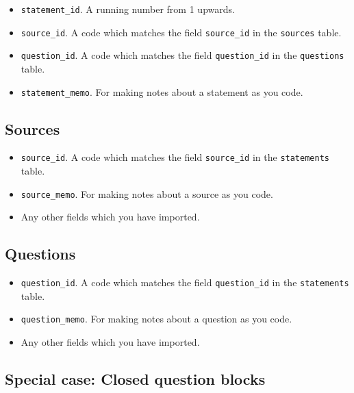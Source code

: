 \documentclass[
]{book}
\providecommand{\tightlist}{%
  \setlength{\itemsep}{0pt}\setlength{\parskip}{0pt}}
\begin{document}
\begin{itemize}
\tightlist
\item
  \texttt{statement\_id}. A running number from 1 upwards.
\item
  \texttt{source\_id}. A code which matches the field \texttt{source\_id} in the \texttt{sources} table.
\item
  \texttt{question\_id}. A code which matches the field \texttt{question\_id} in the \texttt{questions} table.
\item
  \texttt{statement\_memo}. For making notes about a statement as you code.
\end{itemize}

\hypertarget{sources}{%
\subsection{Sources}\label{sources}}

\begin{itemize}
\tightlist
\item
  \texttt{source\_id}. A code which matches the field \texttt{source\_id} in the \texttt{statements} table.
\item
  \texttt{source\_memo}. For making notes about a source as you code.
\item
  Any other fields which you have imported.
\end{itemize}

\hypertarget{questions}{%
\subsection{Questions}\label{questions}}

\begin{itemize}
\tightlist
\item
  \texttt{question\_id}. A code which matches the field \texttt{question\_id} in the \texttt{statements} table.
\item
  \texttt{question\_memo}. For making notes about a question as you code.
\item
  Any other fields which you have imported.
\end{itemize}

\hypertarget{special-case-closed-question-blocks}{%
\subsection{Special case: Closed question blocks}\label{special-case-closed-question-blocks}}
\end{document}
